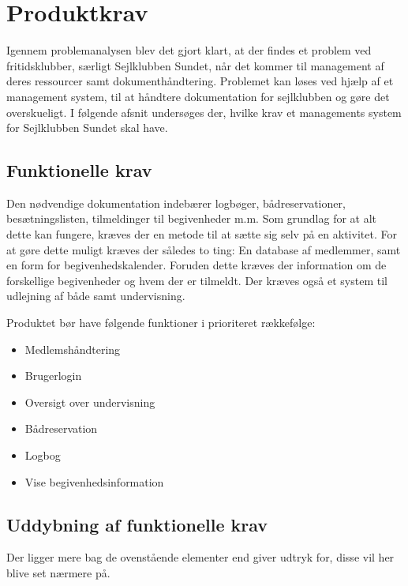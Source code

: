 \chapter{Produktkrav}

Igennem problemanalysen blev det gjort klart, at der findes et problem ved fritidsklubber, særligt Sejlklubben Sundet, når det kommer til management af deres ressourcer samt dokumenthåndtering. 
Problemet kan løses ved hjælp af et management system, til at håndtere dokumentation for sejlklubben og gøre det overskueligt. 
I følgende afsnit undersøges der, hvilke krav et managements system for Sejlklubben Sundet skal have. 


\section{Funktionelle krav} \label{sec:funktionelleKrav}

Den nødvendige dokumentation indebærer logbøger, bådreservationer, besætningslisten, tilmeldinger til begivenheder m.m. 
Som grundlag for at alt dette kan fungere, kræves der en metode til at sætte sig selv på en aktivitet. 
For at gøre dette muligt kræves der således to ting: En database af medlemmer, samt en form for begivenhedskalender. 
Foruden dette kræves der information om de forskellige begivenheder og hvem der er tilmeldt. 
Der kræves også et system til udlejning af både samt undervisning.

Produktet bør have følgende funktioner i prioriteret rækkefølge:
\begin{itemize}
  \item Medlemshåndtering
  \item Brugerlogin
  \item Oversigt over undervisning
  \item Bådreservation
  \item Logbog
  \item Vise begivenhedsinformation
\end{itemize}



\section{Uddybning af funktionelle krav}

Der ligger mere bag de ovenstående elementer end  giver udtryk for, disse vil her blive set nærmere på.

